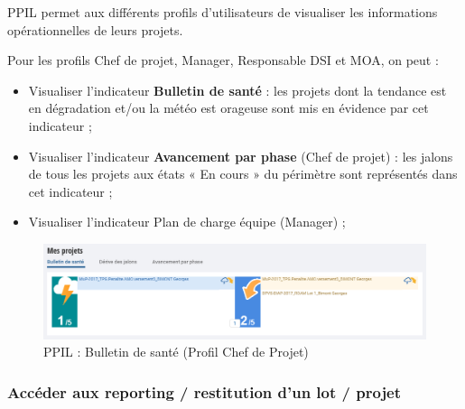 PPIL permet aux différents profils d'utilisateurs de visualiser les informations opérationnelles de leurs projets.

Pour les profils Chef de projet, Manager, Responsable DSI et MOA, on peut :
\begin{itemize}
    \item Visualiser l’indicateur \textbf{Bulletin de santé} : les projets dont la tendance est en dégradation et/ou la météo est orageuse sont mis en évidence par cet indicateur ;
    \item Visualiser l’indicateur \textbf{Avancement par phase} (Chef de projet) : les jalons de tous les projets aux états « En cours » du périmètre sont représentés dans cet indicateur ;
    \item Visualiser l’indicateur Plan de charge équipe (Manager) ;
\end{itemize}

\begin{figure}[h]
\centering
\includegraphics[width=1\textwidth]{images/ppil-bulletion-de-sante.PNG}
\caption{PPIL : Bulletin de santé (Profil Chef de Projet)}
\end{figure}

\subsubsection{Accéder aux reporting / restitution d'un lot / projet}

